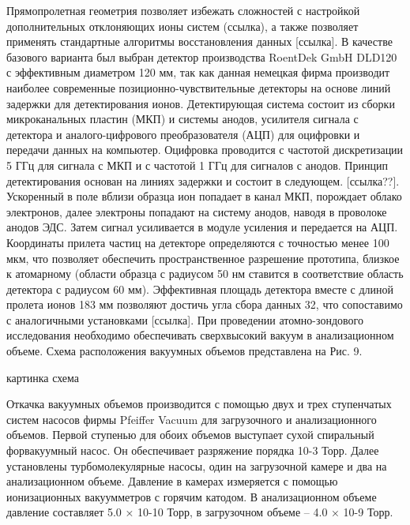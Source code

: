 Прямопролетная геометрия позволяет избежать сложностей с настройкой дополнительных отклоняющих ионы систем (ссылка), а также позволяет применять стандартные алгоритмы восстановления данных [ссылка]. В качестве базового варианта был выбран детектор производства RoentDek GmbH DLD120 с эффективным диаметром 120 мм, так как данная немецкая фирма производит наиболее современные позиционно-чувствительные детекторы на основе линий задержки для детектирования ионов. Детектирующая система состоит из сборки микроканальных пластин (МКП) и системы анодов, усилителя сигнала с детектора и аналого-цифрового преобразователя (АЦП) для оцифровки и передачи данных на компьютер. Оцифровка проводится с частотой дискретизации 5 ГГц для сигнала с МКП и с частотой 1 ГГц для сигналов с анодов. Принцип детектирования основан на линиях задержки и состоит в следующем. [ссылка??]. Ускоренный в поле вблизи образца ион попадает в канал МКП, порождает облако электронов, далее электроны попадают на систему анодов, наводя в проволоке анодов ЭДС. Затем сигнал усиливается в модуле усиления и передается на АЦП. Координаты прилета частиц на детекторе определяются с точностью менее 100 мкм, что позволяет обеспечить пространственное разрешение прототипа, близкое к атомарному (области образца с радиусом 50 нм ставится в соответствие область детектора с радиусом 60 мм). Эффективная площадь детектора вместе с длиной пролета ионов 183 мм позволяют достичь угла сбора данных 32, что сопоставимо с аналогичными установками [ссылка]. При проведении атомно-зондового исследования необходимо обеспечивать сверхвысокий вакуум в анализационном объеме. Схема расположения вакуумных объемов представлена на Рис. 9.

картинка схема

Откачка вакуумных объемов производится с помощью двух и трех ступенчатых систем насосов фирмы Pfeiffer Vacuum для загрузочного и анализационного объемов. Первой ступенью для обоих объемов выступает сухой спиральный форвакуумный насос. Он обеспечивает разряжение порядка 10-3 Торр. Далее установлены турбомолекулярные насосы, один на загрузочной камере и два на анализационном объеме. Давление в камерах измеряется с помощью ионизационных вакуумметров с горячим катодом. В анализационном объеме давление составляет 5.0 × 10-10 Торр, в загрузочном объеме – 4.0 × 10-9 Торр.

